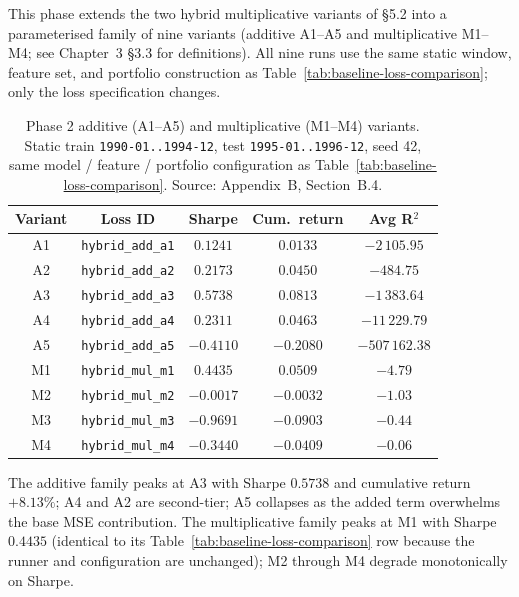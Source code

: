 \label{sec:phase2-hybrid-am-sweep}

This phase extends the two hybrid multiplicative variants of \S5.2 into a parameterised family of nine variants (additive A1--A5 and multiplicative M1--M4; see Chapter~3 \S3.3 for definitions). All nine runs use the same static window, feature set, and portfolio construction as Table~\ref{tab:baseline-loss-comparison}; only the loss specification changes.

\begin{table}[H]
\centering
\caption{Phase 2 additive (A1--A5) and multiplicative (M1--M4) variants. Static train \texttt{1990-01..1994-12}, test \texttt{1995-01..1996-12}, seed 42, same model / feature / portfolio configuration as Table~\ref{tab:baseline-loss-comparison}. Source: Appendix~B, Section~B.4.}
\label{tab:phase2-variants}
\begin{tabular}{ccccc}
\toprule
Variant & Loss ID & Sharpe & Cum.\ return & Avg R$^2$ \\
\midrule
A1 & \texttt{hybrid\_add\_a1} & $0.1241$ & $0.0133$ & $-2\,105.95$ \\
A2 & \texttt{hybrid\_add\_a2} & $0.2173$ & $0.0450$ & $-484.75$ \\
A3 & \texttt{hybrid\_add\_a3} & $\mathbf{0.5738}$ & $\mathbf{0.0813}$ & $-1\,383.64$ \\
A4 & \texttt{hybrid\_add\_a4} & $0.2311$ & $0.0463$ & $-11\,229.79$ \\
A5 & \texttt{hybrid\_add\_a5} & $-0.4110$ & $-0.2080$ & $-507\,162.38$ \\
M1 & \texttt{hybrid\_mul\_m1} & $\mathbf{0.4435}$ & $\mathbf{0.0509}$ & $-4.79$ \\
M2 & \texttt{hybrid\_mul\_m2} & $-0.0017$ & $-0.0032$ & $-1.03$ \\
M3 & \texttt{hybrid\_mul\_m3} & $-0.9691$ & $-0.0903$ & $-0.44$ \\
M4 & \texttt{hybrid\_mul\_m4} & $-0.3440$ & $-0.0409$ & $-0.06$ \\
\bottomrule
\end{tabular}
\end{table}

The additive family peaks at A3 with Sharpe $0.5738$ and cumulative return $+8.13\%$; A4 and A2 are second-tier; A5 collapses as the added term overwhelms the base MSE contribution. The multiplicative family peaks at M1 with Sharpe $0.4435$ (identical to its Table~\ref{tab:baseline-loss-comparison} row because the runner and configuration are unchanged); M2 through M4 degrade monotonically on Sharpe.

